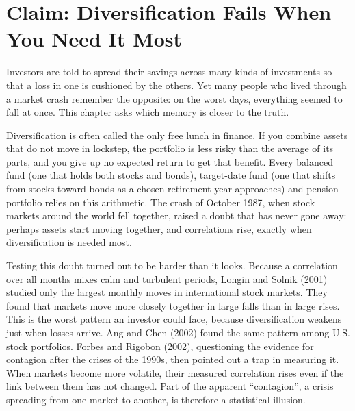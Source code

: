 \makeatletter
{}
\makeatother

\makeatletter
\makeatother

\chapter{Claim: Diversification Fails When You Need It Most}
\label{ch:10}

Investors are told to spread their savings across many kinds of investments so that a loss in one is cushioned by the others. Yet many people who lived through a market crash remember the opposite: on the worst days, everything seemed to fall at once. This chapter asks which memory is closer to the truth.

Diversification is often called the only free lunch in finance. If you combine assets that do not move in lockstep, the portfolio is less risky than the average of its parts, and you give up no expected return to get that benefit. Every balanced fund (one that holds both stocks and bonds), target-date fund (one that shifts from stocks toward bonds as a chosen retirement year approaches) and pension portfolio relies on this arithmetic. The crash of October 1987, when stock markets around the world fell together, raised a doubt that has never gone away: perhaps assets start moving together, and correlations rise, exactly when diversification is needed most.

Testing this doubt turned out to be harder than it looks. Because a correlation over all months mixes calm and turbulent periods, Longin and Solnik (2001) studied only the largest monthly moves in international stock markets. They found that markets move more closely together in large falls than in large rises. This is the worst pattern an investor could face, because diversification weakens just when losses arrive. Ang and Chen (2002) found the same pattern among U.S. stock portfolios. Forbes and Rigobon (2002), questioning the evidence for contagion after the crises of the 1990s, then pointed out a trap in measuring it. When markets become more volatile, their measured correlation rises even if the link between them has not changed. Part of the apparent ``contagion'', a crisis spreading from one market to another, is therefore a statistical illusion.

